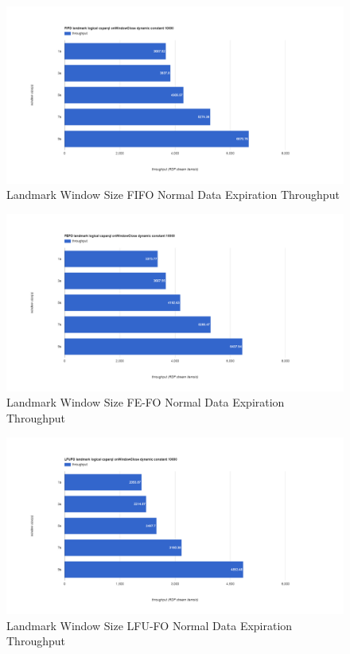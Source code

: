 \begin{figure}[!htbp]
	\centering
    \includegraphics[width=\textwidth]{img/app3-land-ws-fifo-normal-t.png}
    \caption{Landmark Window Size FIFO Normal Data Expiration Throughput}
\end{figure}
\begin{figure}[!htbp]
	\centering
    \includegraphics[width=\textwidth]{img/app3-land-ws-fefo-normal-t.png}
    \caption{Landmark Window Size FE-FO Normal Data Expiration Throughput}
\end{figure}
\begin{figure}[!htbp]
	\centering
    \includegraphics[width=\textwidth]{img/app3-land-ws-lfufo-normal-t.png}
    \caption{Landmark Window Size LFU-FO Normal Data Expiration Throughput}
\end{figure}
